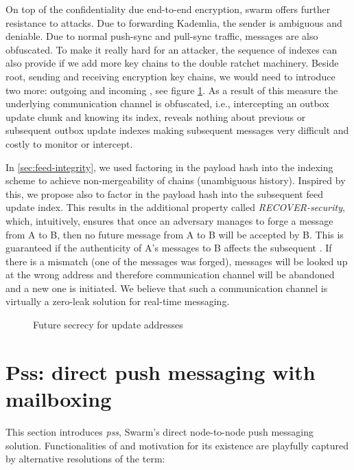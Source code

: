 On top of the confidentiality due end-to-end encryption, swarm offers further resistance  to attacks. Due to forwarding Kademlia, the sender is ambiguous and deniable. Due to  normal push-sync and  pull-sync traffic, messages are also obfuscated. To make it really hard for an attacker, the sequence of indexes can also provide  if we add more key chains to the double ratchet machinery. Beside root, sending and receiving encryption key chains, we would need to introduce two more: outgoing and incoming , see figure \ref{fig:double-ratchet-for-feeds}. As a result of this measure the underlying communication channel  is obfuscated, i.e., intercepting an outbox update chunk and knowing its index, reveals nothing about previous or subsequent outbox update indexes making subsequent messages very difficult and costly to monitor or intercept.

In \ref{sec:feed-integrity}, we used factoring in the payload hash into the indexing scheme to achieve non-mergeability of chains (unambiguous history). Inspired by this, we propose also to factor in the payload hash into the subsequent feed update index. This results in the additional property called \emph{RECOVER-security},  which, intuitively, ensures that once an adversary manages to forge a message from A to B, then no future message from A to B will  be  accepted  by B.
This is guaranteed if the authenticity of A's  messages to B affects the subsequent . If there is a mismatch (one of the messages was forged), messages will be looked up at the wrong address and therefore communication channel will be abandoned and a new one is initiated. We believe that such a communication channel is virtually a zero-leak solution for real-time messaging.


\begin{figure}[htbp]
\centering
\caption[Future secrecy for update addresses \statusred]{Future secrecy for update addresses}
\label{fig:double-ratchet-for-feeds}
\end{figure}



\section{Pss: direct push messaging with mailboxing\statusgreen}\label{sec:pss}

\green{}

This section introduces \emph{pss}, Swarm's direct node-to-node push messaging solution. 
Functionalities of and motivation for its existence are playfully captured by alternative resolutions of the term:

